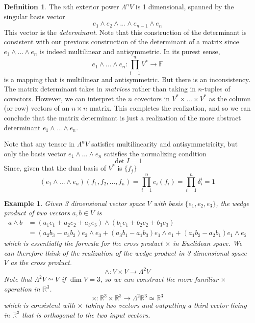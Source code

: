 \documentclass{article}
\newtheorem{example}{Example}[section]
\theoremstyle{remark}
\theoremstyle{definition}
\newtheorem{definition}{Definition}[section]
\begin{document}
    \begin{definition}
    The $n$th exterior power $\Lambda^n V$ is 1 dimensional, spanned by the singular basis vector 
    \[e_1 \wedge e_2 \wedge ... \wedge e_{n-1} \wedge e_n\]
    This vector is the \textit{determinant}. Note that this construction of the determinant is consistent with our previous construction of the determinant of a matrix since $e_1 \wedge ... \wedge e_n$ is indeed multilinear and antisymmetric. In its purest sense, 
    \[e_1 \wedge ... \wedge e_n: \prod_{i=1}^n V^* \longrightarrow \mathbb{F}\]
    is a mapping that is multilinear and antisymmetric. But there is an inconsistency. The matrix determinant takes in \textit{matrices} rather than taking in $n$-tuples of covectors. However, we can interpret the $n$ covectors in $V^* \times ... \times V^*$ as the column (or row) vectors of an $n \times n$ matrix. This completes the realization, and so we can conclude that the matrix determinant is just a realization of the more abstract determinant $e_1 \wedge ... \wedge e_n$. 

    Note that any tensor in $\Lambda^n V$ satisfies multilinearity and antisymmetricity, but only the basis vector $e_1 \wedge ... \wedge e_n$ satisfies the normalizing condition
    \[\det{I} = 1\]
    Since, given that the dual basis of $V^*$ is $\{f_j\}$
    \[(e_1 \wedge ... \wedge e_n) (f_1, f_2, ..., f_n) = \prod_{i=1}^n e_i (f_i) = \prod_{i=1}^n \delta_i^i = 1\]
    \end{definition}

    \begin{example}
    Given 3 dimensional vector space $V$ with basis $\{e_1, e_2, e_3\}$, the wedge product of two vectors $a, b \in V$ is 
    \begin{align*}
        a \wedge b & = (a_1 e_1 + a_2 e_2 + a_3 e_3) \wedge (b_1 e_1 + b_2 e_2 + b_3 e_3) \\
        & = (a_2 b_3 - a_3 b_2) e_2 \wedge e_3 + (a_3 b_1 - a_1 b_3) e_3 \wedge e_1 + (a_1 b_2 - a_2 b_1) e_1 \wedge e_2 
    \end{align*}
    which is essentially the formula for the cross product $\times$ in Euclidean space. We can therefore think of the realization of the wedge product in 3 dimensional space $V$ as the cross product. 
    \[\wedge: V \times V \longrightarrow \Lambda^2 V\]
    Note that $\Lambda^2 V \simeq V$ if $\dim{V} = 3$, so we can construct the more familiar $\times$ operation in $\mathbb{R}^3$. 
    \[\times: \mathbb{R}^3 \times \mathbb{R}^3 \longrightarrow \Lambda^2 \mathbb{R}^3 \simeq \mathbb{R}^3\]
    which is consistent with $\times$ taking two vectors and outputting a third vector living in $\mathbb{R}^3$ that is orthogonal to the two input vectors. 
    \end{example}
\end{document}

